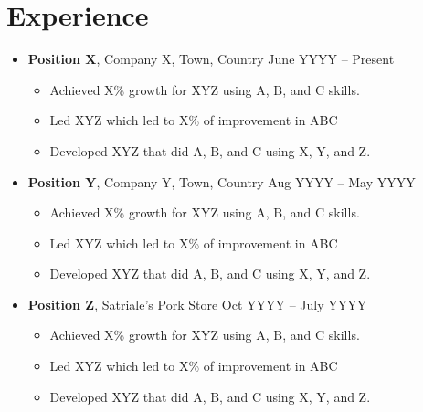 \documentclass[12pt,a4paper]{article}
\begin{document}
\section{Experience}
\begin{itemize}[leftmargin=0cm, topsep=-2em, itemsep=-0.0em, label={}]
\item \textbf{Position X}, Company X, Town, Country \hfill June YYYY -- Present
\begin{itemize}[leftmargin=*, topsep=-2em, itemsep=-0.7em, label=\textbullet]
\item Achieved X\% growth for XYZ using A, B, and C skills.
\item Led XYZ which led to X\% of improvement in ABC
\item Developed XYZ that did A, B, and C using X, Y, and Z.
\end{itemize}
\item \textbf{Position Y}, Company Y, Town, Country \hfill Aug YYYY -- May YYYY
\begin{itemize}[leftmargin=*, topsep=-2em, itemsep=-0.7em, label=\textbullet]
\item Achieved X\% growth for XYZ using A, B, and C skills.
\item Led XYZ which led to X\% of improvement in ABC
\item Developed XYZ that did A, B, and C using X, Y, and Z.
\end{itemize}
\item \textbf{Position Z}, Satriale's Pork Store \hfill Oct YYYY -- July YYYY
\begin{itemize}[leftmargin=*, topsep=-2em, itemsep=-0.7em, label=\textbullet]
\item Achieved X\% growth for XYZ using A, B, and C skills.
\item Led XYZ which led to X\% of improvement in ABC
\item Developed XYZ that did A, B, and C using X, Y, and Z.
\end{itemize}
\end{itemize}
\end{document}
